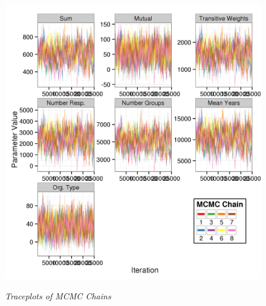 \documentclass[12pt,a4paper,titlepage]{article}
\begin{document}
\begin{figure}[!ht]
\caption{\textit{Traceplots of MCMC Chains}}
\graphicspath{ {`/Users/TScott/Google\space Drive/elwha/PSJ_Submission/Version3'}}
\noindent
\includegraphics[width=6.5in]
{traceplotdu}
\label{figure:traceplots}
\end{figure}
\end{document}
